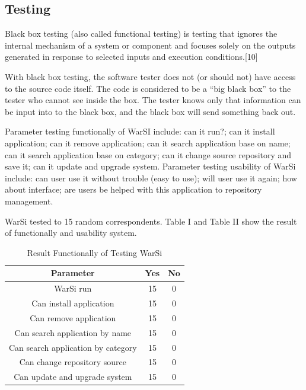 \documentclass[conference, letterpaper]{IEEEtran}
\begin{document}
\subsection{Testing}
Black box testing (also called functional testing) is testing that ignores the internal mechanism of a system or component and focuses solely on the outputs generated in response to selected inputs and execution conditions.[10]

With black box testing, the software tester does not (or should not) have access to the source code itself. The code is considered to be a “big black box” to the tester who cannot see inside the box. The tester knows only that information can be input into to the black box, and the black box will send something back out.

Parameter testing functionally of WarSI include: can it run?; can it install application; can it remove application; can it search application base on name; can it search application base on category; can it change source repository and save it; can it update and upgrade system. Parameter testing usability of WarSi include: can user use it without trouble (easy to use); will user use it again; how about interface; are users be helped with this application to repository management. 

WarSi tested to 15 random correspondents. Table I and Table II show the result of functionally and usability system.

\begin{table}[!t]
\renewcommand{\arraystretch}{1.3}
\caption{Result Functionally of Testing WarSi}
\label{table_functional}
\centering
\begin{tabular}{|c|c|c|}
\hline
\textbf{Parameter} & \textbf{Yes} & \textbf{No}\\
\hline
WarSi run & 15 & 0\\
\hline
Can install application & 15 & 0\\
\hline
Can remove application & 15 & 0\\
\hline
Can search application by name & 15 & 0\\
\hline
Can search application by category & 15 & 0\\
\hline
Can change repository source & 15 & 0\\
\hline
Can update and upgrade system & 15 & 0\\
\hline
\end{tabular}
\end{table}
\end{document}

